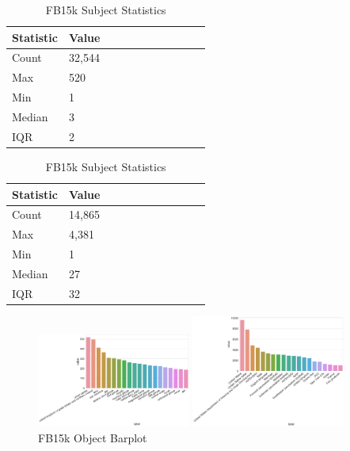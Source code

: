 \begin{table}[H]
	\parbox{.5\linewidth}{
		\caption{WN18 Subject Statistics}
		\centering
		\begin{tabular}{lllllllllll}
  			\textbf{Statistic} & \textbf{Value}  \\
  			\hline
			Count & 32,544 \\
			Max & 520 \\
			Min & 1 \\
  			Median & 3 \\
  			IQR & 2 \\
		\end{tabular}
		}
	\hfill
	\parbox{.5\linewidth}{
		\caption{FB15k Subject Statistics}
		\centering
		\begin{tabular}{lllllllllll}
  			\textbf{Statistic} & \textbf{Value}  \\
  			\hline
			Count &14,865 \\
			Max & 4,381 \\
			Min & 1 \\
  			Median & 27 \\
  			IQR & 32 \\
		\end{tabular}
		}
\end{table}


\begin{figure}[H]
	\parbox{.5\linewidth}{
   		\caption{WN18 Object Barplot}
   		\centering
    		\includegraphics[width=0.45\textwidth, height=0.2\textheight]{WN18_Object_Counts}
		}
	\hfill
	\parbox{.5\linewidth}{
		\caption{FB15k Object Barplot}
   		\centering
		\includegraphics[width=0.45\textwidth, height=0.2\textheight]{FB15k_Object_Counts}
		}
\end{figure}


